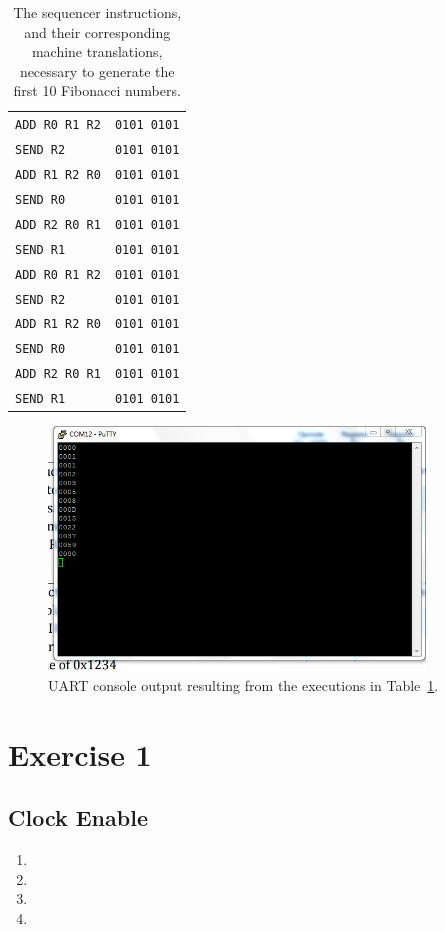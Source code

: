 \documentclass[]{article}
\begin{document}
\begin{table}[H]
\begin{tabular}{ l | l }
\texttt{ADD R0 R1 R2} & \texttt{0101 0101}\\
\texttt{SEND R2} & \texttt{0101 0101}\\
\texttt{ADD R1 R2 R0} & \texttt{0101 0101}\\
\texttt{SEND R0} & \texttt{0101 0101}\\
\texttt{ADD R2 R0 R1} & \texttt{0101 0101}\\
\texttt{SEND R1} & \texttt{0101 0101}\\
\texttt{ADD R0 R1 R2} & \texttt{0101 0101}\\
\texttt{SEND R2} & \texttt{0101 0101}\\
\texttt{ADD R1 R2 R0} & \texttt{0101 0101}\\
\texttt{SEND R0} & \texttt{0101 0101}\\
\texttt{ADD R2 R0 R1} & \texttt{0101 0101}\\
\texttt{SEND R1} & \texttt{0101 0101}\\
\end{tabular}
\caption{The sequencer instructions, and their corresponding machine translations, necessary to generate the first 10 Fibonacci numbers.}
\label{table:fib}
\end{table}

\begin{figure}[H]
\centering
\includegraphics[width=10cm]{fib.PNG}
\caption{UART console output resulting from the executions in Table~\ref{table:fib}.}
\end{figure}

\section{Exercise 1}


\subsection{Clock Enable}
\begin{enumerate}
\item 
\item 
\item 
\item 
\end{enumerate}
\end{document}

